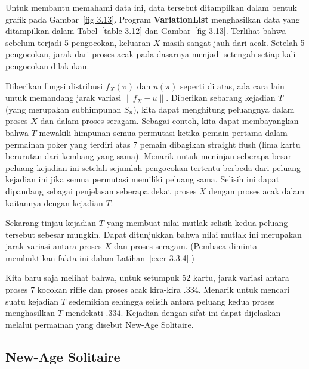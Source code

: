 \par Untuk membantu memahami data ini, data tersebut ditampilkan dalam bentuk grafik
pada Gambar~\ref{fig 3.13}.  Program {\bf VariationList}
menghasilkan data yang ditampilkan dalam Tabel~\ref{table 3.12} dan
Gambar~\ref{fig 3.13}.  Terlihat bahwa sebelum terjadi 5 pengocokan, keluaran $X$ masih
sangat jauh dari acak.  Setelah 5 pengocokan, jarak dari proses acak pada dasarnya menjadi
setengah setiap kali pengocokan dilakukan.
\par Diberikan fungsi distribusi $f_X(\pi)$ dan $u(\pi)$ seperti di atas, ada cara lain
untuk memandang jarak variasi $\parallel f_X - u\parallel$.  Diberikan sebarang kejadian
$T$ (yang merupakan subhimpunan $S_n$), kita dapat menghitung peluangnya dalam proses $X$
dan dalam proses seragam.  Sebagai contoh, kita dapat membayangkan bahwa $T$ mewakili
himpunan semua permutasi ketika pemain pertama dalam permainan poker yang terdiri atas 7
pemain dibagikan straight flush (lima kartu berurutan dari kembang yang sama).  Menarik
untuk meninjau seberapa besar peluang kejadian ini setelah sejumlah pengocokan tertentu
berbeda dari peluang kejadian ini jika semua permutasi memiliki peluang sama.  Selisih
ini dapat dipandang sebagai penjelasan seberapa dekat proses $X$ dengan proses acak dalam
kaitannya dengan kejadian $T$.
\par Sekarang tinjau kejadian $T$ yang membuat nilai mutlak selisih kedua peluang tersebut
sebesar mungkin.  Dapat ditunjukkan bahwa nilai mutlak ini merupakan jarak variasi antara
proses $X$ dan proses seragam.  (Pembaca diminta membuktikan fakta ini dalam
Latihan~\ref{exer 3.3.4}.)
\par Kita baru saja melihat bahwa, untuk setumpuk 52 kartu, jarak variasi antara proses
7 kocokan riffle dan proses acak kira-kira $.334$.  Menarik untuk mencari suatu kejadian
$T$ sedemikian sehingga selisih antara peluang kedua proses menghasilkan $T$ mendekati
$.334$.  Kejadian dengan sifat ini dapat dijelaskan melalui permainan yang disebut
New-Age Solitaire.

\subsection*{New-Age Solitaire}

